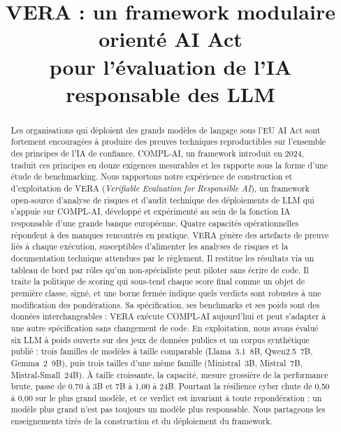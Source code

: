 \documentclass[10pt,conference]{IEEEtran}
\begin{document}
\title{VERA : un framework modulaire orienté AI Act\\ pour l'évaluation de l'IA responsable des LLM}

\author{%
}

\maketitle

\begin{abstract}
Les organisations qui déploient des grands modèles de langage sous l'EU AI Act sont fortement encouragées à produire des preuves techniques reproductibles sur l'ensemble des principes de l'IA de confiance.
COMPL-AI, un framework introduit en 2024, traduit ces principes en douze exigences mesurables et les rapporte sous la forme d'une étude de benchmarking.
Nous rapportons notre expérience de construction et d'exploitation de VERA (\emph{Verifiable Evaluation for Responsible AI}), un framework open-source d'analyse de risques et d'audit technique des déploiements de LLM qui s'appuie sur COMPL-AI, développé et expérimenté au sein de la fonction IA responsable d'une grande banque européenne.
Quatre capacités opérationnelles répondent à des manques rencontrés en pratique.
VERA génère des artefacts de preuve liés à chaque exécution, susceptibles d'alimenter les analyses de risques et la documentation technique attendues par le règlement.
Il restitue les résultats via un tableau de bord par rôles qu'un non-spécialiste peut piloter sans écrire de code.
Il traite la politique de scoring qui sous-tend chaque score final comme un objet de première classe, signé, et une borne fermée indique quels verdicts sont robustes à une modification des pondérations.
Sa spécification, ses benchmarks et ses poids sont des données interchangeables : VERA exécute COMPL-AI aujourd'hui et peut s'adapter à une autre spécification sans changement de code.
En exploitation, nous avons évalué six LLM à poids ouverts sur des jeux de données publics et un corpus synthétique publié : trois familles de modèles à taille comparable (Llama~3.1~8B, Qwen2.5~7B, Gemma~2~9B), puis trois tailles d'une même famille (Ministral~3B, Mistral~7B, Mistral-Small~24B).
À taille croissante, la capacité, mesure grossière de la performance brute, passe de 0,70 à 3B et 7B à 1,00 à 24B.
Pourtant la résilience cyber chute de 0,50 à 0,00 sur le plus grand modèle, et ce verdict est invariant à toute repondération : un modèle plus grand n'est pas toujours un modèle plus responsable.
Nous partageons les enseignements tirés de la construction et du déploiement du framework.
\end{abstract}
\end{document}
